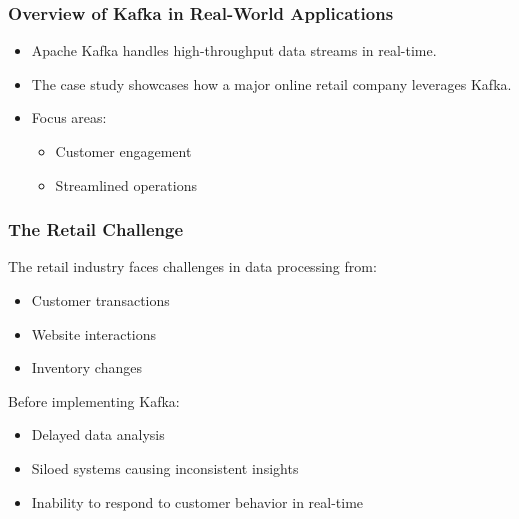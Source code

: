 \documentclass[aspectratio=169]{beamer}
\begin{document}
\begin{frame}
  \frametitle{Overview of Kafka in Real-World Applications}
  \begin{itemize}
    \item Apache Kafka handles high-throughput data streams in real-time.
    \item The case study showcases how a major online retail company leverages Kafka.
    \item Focus areas:
    \begin{itemize}
      \item Customer engagement
      \item Streamlined operations
    \end{itemize}
  \end{itemize}
\end{frame}

\begin{frame}
  \frametitle{The Retail Challenge}
  The retail industry faces challenges in data processing from:
  \begin{itemize}
    \item Customer transactions
    \item Website interactions
    \item Inventory changes
  \end{itemize}
  
  Before implementing Kafka:
  \begin{itemize}
    \item Delayed data analysis
    \item Siloed systems causing inconsistent insights
    \item Inability to respond to customer behavior in real-time
  \end{itemize}
\end{frame}
\end{document}
